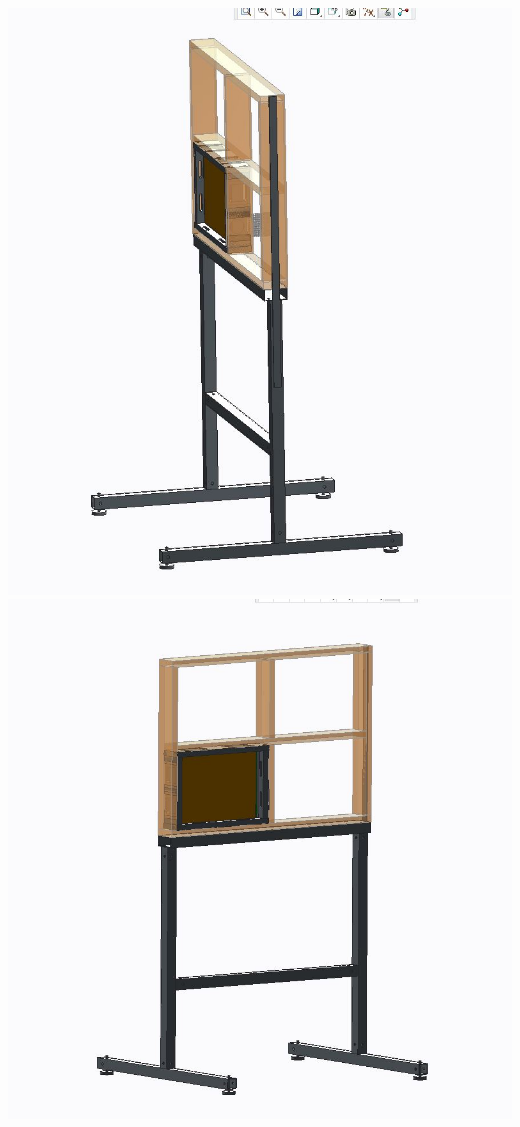 \documentclass[11pt,french,a4paper]{report}
\begin{document}
\includegraphics[scale=0.3]{../images/schema_ruche/supportrucheplate1.JPG}
\includegraphics[scale=0.3]{../images/schema_ruche/supportrucheplate.JPG} \\
\end{document}
